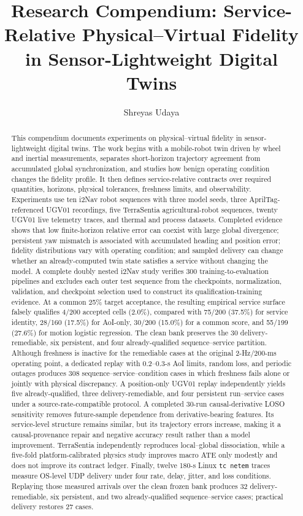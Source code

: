 \documentclass[journal,onecolumn]{IEEEtran}
\title{Research Compendium: Service-Relative Physical--Virtual Fidelity in Sensor-Lightweight Digital Twins}
\author{Shreyas Udaya}
\begin{document}
\maketitle

\begin{abstract}
This compendium documents experiments on physical--virtual fidelity in sensor-lightweight digital twins. The work begins with a mobile-robot twin driven by wheel and inertial measurements, separates short-horizon trajectory agreement from accumulated global synchronization, and studies how benign operating condition changes the fidelity profile. It then defines service-relative contracts over required quantities, horizons, physical tolerances, freshness limits, and observability. Experiments use ten i2Nav robot sequences with three model seeds, three AprilTag-referenced UGV01 recordings, five TerraSentia agricultural-robot sequences, twenty UGV01 live telemetry traces, and thermal and process datasets. Completed evidence shows that low finite-horizon relative error can coexist with large global divergence; persistent yaw mismatch is associated with accumulated heading and position error; fidelity distributions vary with operating condition; and sampled delivery can change whether an already-computed twin state satisfies a service without changing the model. A complete doubly nested i2Nav study verifies 300 training-to-evaluation pipelines and excludes each outer test sequence from the checkpoints, normalization, validation, and checkpoint selection used to construct its qualification-training evidence. At a common 25\% target acceptance, the resulting empirical service surface falsely qualifies 4/200 accepted cells (2.0\%), compared with 75/200 (37.5\%) for service identity, 28/160 (17.5\%) for AoI-only, 30/200 (15.0\%) for a common score, and 55/199 (27.6\%) for motion logistic regression. The clean bank preserves the 30 delivery-remediable, six persistent, and four already-qualified sequence--service partition. Although freshness is inactive for the remediable cases at the original 2-Hz/200-ms operating point, a dedicated replay with 0.2--0.3-s AoI limits, random loss, and periodic outages produces 308 sequence--service--condition cases in which freshness fails alone or jointly with physical discrepancy. A position-only UGV01 replay independently yields five already-qualified, three delivery-remediable, and four persistent run--service cases under a source-rate-compatible protocol. A completed 30-run causal-derivative LOSO sensitivity removes future-sample dependence from derivative-bearing features. Its service-level structure remains similar, but its trajectory errors increase, making it a causal-provenance repair and negative accuracy result rather than a model improvement. TerraSentia independently reproduces local--global dissociation, while a five-fold platform-calibrated physics study improves macro ATE only modestly and does not improve its contract ledger. Finally, twelve 180-s Linux \texttt{tc netem} traces measure OS-level UDP delivery under four rate, delay, jitter, and loss conditions. Replaying those measured arrivals over the clean frozen bank produces 32 delivery-remediable, six persistent, and two already-qualified sequence--service cases; practical delivery restores 27 cases.

\end{abstract}
\end{document}
